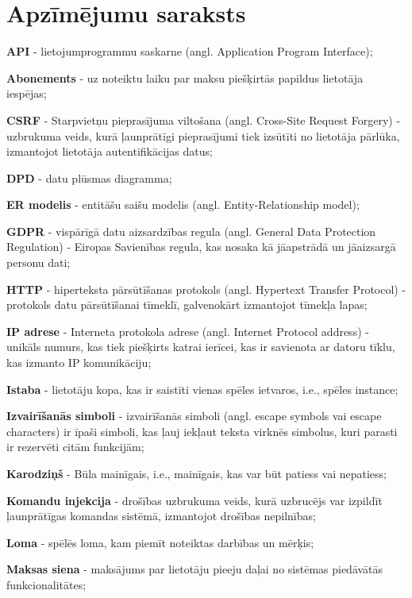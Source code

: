 \section*{Apzīmējumu saraksts}

\textbf{API} - lietojumprogrammu saskarne (angl. Application Program Interface);

\textbf{Abonements} - uz noteiktu laiku par maksu piešķirtās papildus lietotāja iespējas;

\textbf{CSRF} - Starpvietņu pieprasījuma viltošana (angl. Cross-Site Request Forgery) - uzbrukuma veids, kurā ļaunprātīgi pieprasījumi tiek izsūtīti no lietotāja pārlūka, izmantojot lietotāja autentifikācijas datus;

\textbf{DPD} - datu plūsmas diagramma;

\textbf{ER modelis} - entitāšu saišu modelis (angl. Entity-Relationship model);

\textbf{GDPR} - vispārīgā datu aizsardzības regula (angl. General Data Protection Regulation) - Eiropas Savienības regula, kas nosaka kā jāapstrādā un jāaizsargā personu dati;

\textbf{HTTP} - hiperteksta pārsūtīšanas protokols (angl. Hypertext Transfer Protocol) - protokols datu pārsūtīšanai tīmeklī, galvenokārt izmantojot tīmekļa lapas;

\textbf{IP adrese} - Interneta protokola adrese (angl. Internet Protocol address) - unikāls numurs, kas tiek piešķirts katrai ierīcei, kas ir savienota ar datoru tīklu, kas izmanto IP komunikāciju;

\textbf{Istaba} - lietotāju kopa, kas ir saistīti vienas spēles ietvaros, i.e., spēles instance;

\textbf{Izvairīšanās simboli} - izvairīšanās simboli (angl. escape symbols vai escape characters) ir īpaši simboli, kas ļauj iekļaut teksta virknēs simbolus, kuri parasti ir rezervēti citām funkcijām;

\textbf{Karodziņš} - Būla mainīgais, i.e., mainīgais, kas var būt patiess vai nepatiess;

\textbf{Komandu injekcija} - drošības uzbrukuma veids, kurā uzbrucējs var izpildīt ļaunprātīgas komandas sistēmā, izmantojot drošības nepilnības;

\textbf{Loma} - spēlēs loma, kam piemīt noteiktas darbības un mērķis;

\textbf{Maksas siena} - maksājums par lietotāju pieeju daļai no sistēmas piedāvātās funkcionalitātes;


